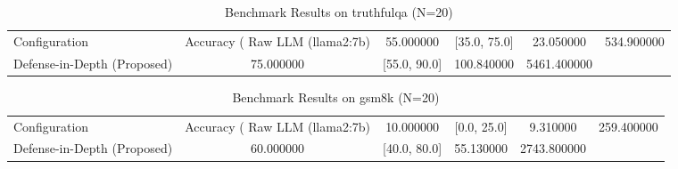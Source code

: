 \begin{table}
\caption{Benchmark Results on truthfulqa (N=20)}
\label{tab:truthfulqa_benchmark}
\begin{tabular}{lcccc}
\toprule
Configuration & Accuracy (%
\midrule
Raw LLM (llama2:7b) & 55.000000 & [35.0, 75.0] & 23.050000 & 534.900000 \\
Defense-in-Depth (Proposed) & 75.000000 & [55.0, 90.0] & 100.840000 & 5461.400000 \\
\bottomrule
\end{tabular}
\end{table}

\begin{table}
\caption{Benchmark Results on gsm8k (N=20)}
\label{tab:gsm8k_benchmark}
\begin{tabular}{lcccc}
\toprule
Configuration & Accuracy (%
\midrule
Raw LLM (llama2:7b) & 10.000000 & [0.0, 25.0] & 9.310000 & 259.400000 \\
Defense-in-Depth (Proposed) & 60.000000 & [40.0, 80.0] & 55.130000 & 2743.800000 \\
\bottomrule
\end{tabular}
\end{table}
